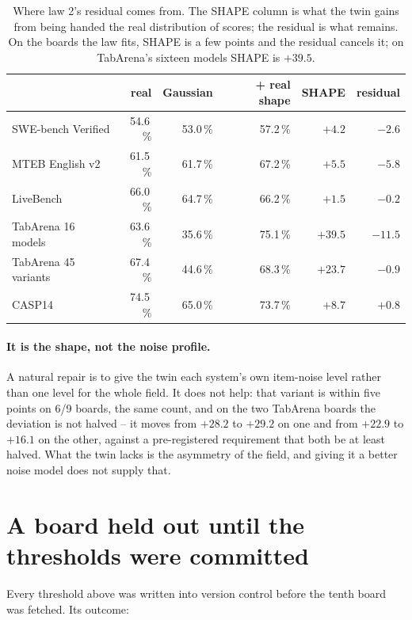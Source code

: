 \documentclass[10pt]{article}
\begin{document}
\begin{table}[t]\centering\small
\begin{tabular}{l rrr rr}
\toprule
 & real & Gaussian & + real shape & SHAPE & residual \\
\midrule
SWE-bench Verified & 54.6\,\% & 53.0\,\% & 57.2\,\% & $+4.2$ & $-2.6$ \\
MTEB English v2 & 61.5\,\% & 61.7\,\% & 67.2\,\% & $+5.5$ & $-5.8$ \\
LiveBench & 66.0\,\% & 64.7\,\% & 66.2\,\% & $+1.5$ & $-0.2$ \\
TabArena 16 models & 63.6\,\% & 35.6\,\% & 75.1\,\% & $+39.5$ & $-11.5$ \\
TabArena 45 variants & 67.4\,\% & 44.6\,\% & 68.3\,\% & $+23.7$ & $-0.9$ \\
CASP14 & 74.5\,\% & 65.0\,\% & 73.7\,\% & $+8.7$ & $+0.8$ \\
\bottomrule
\end{tabular}
\caption{Where law 2's residual comes from. The SHAPE column is what the twin gains from being handed the real distribution of scores; the residual is what remains. On the boards the law fits, SHAPE is a few points and the residual cancels it; on TabArena's sixteen models SHAPE is $+39.5$.}
\label{tab:decomp}
\end{table}

\paragraph{It is the shape, not the noise profile.} A natural repair is to
give the twin each system's own item-noise level rather than one level for
the whole field. It does not help: that variant is within five points on
6/9 boards, the same count, and on the two TabArena boards the deviation
is not halved -- it moves from $+28.2$ to $+29.2$ on one and from $+22.9$ to
$+16.1$ on the other, against a pre-registered requirement that both be at
least halved. What the twin lacks is the asymmetry of the field, and giving
it a better noise model does not supply that.

\section{A board held out until the thresholds were committed}

Every threshold above was written into version control before the tenth
board was fetched. Its outcome:
\end{document}

